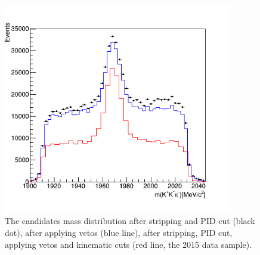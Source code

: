 \begin{figure}[h!]
\includegraphics[width=10cm]{figs/Selection/D_mass.png}
\centering
\caption{The \Kp\Km\pip candidates mass distribution after stripping and PID cut (black dot), after applying vetos (blue line), after stripping, PID cut, applying vetos and kinematic cuts (red line, the 2015 data sample). }

\label{fig:D_mass}
\end{figure}

